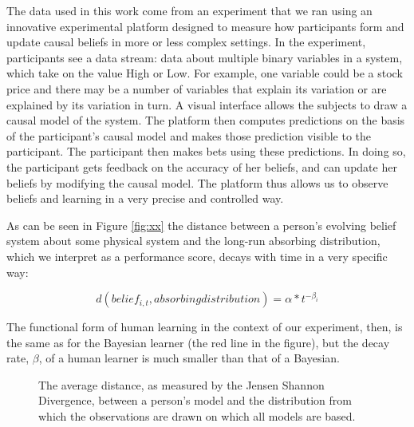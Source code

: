 The data used in this work come from an experiment that we ran using an innovative experimental platform designed to measure how participants form and update causal beliefs in more or less complex settings.  In the experiment, participants see a data stream: data about multiple binary variables in a system, which take on the value High or Low. For example, one variable could be a stock price and there may be a number of variables that explain its variation or are explained by its variation in turn.  A visual interface allows the subjects to draw a causal model of the system. The platform then computes predictions on the basis of the participant's causal model and makes those prediction visible to the participant. The participant then makes bets using these predictions. In doing so, the participant gets feedback on the accuracy of her beliefs, and can update her beliefs by modifying the causal model. The platform thus allows us to observe beliefs and learning in a very precise and controlled way.

As can be seen in Figure \ref{fig:xx} the distance between a person's evolving belief system about some physical system and the long-run absorbing distribution, which we interpret as a performance score, decays with time in a very specific way:

\begin{equation}
\label{ }
d(belief_{i, t}, absorbing distribution) = \alpha*t^{-\beta_i}
\end{equation}



The functional form of human learning in the context of our experiment, then, is the same as for the Bayesian learner (the red line in the figure), but the decay rate, $\beta$, of a human learner is much smaller than that of a Bayesian. 
\vspace{1cm}
\begin{figure}[h]
\label{xx}
\centerline{}
\caption{The average distance, as measured by the Jensen Shannon Divergence, between a person's model and the distribution from which the observations are drawn on which all models are based.}
\label{figure1}
\end{figure}

